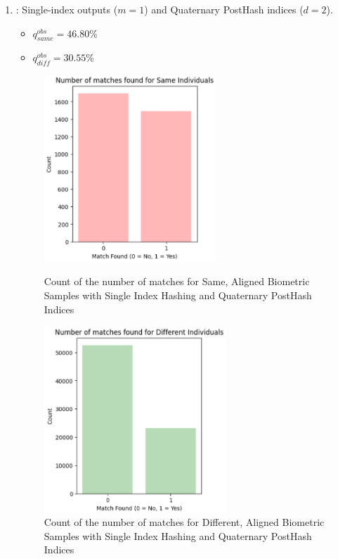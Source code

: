 \begin{enumerate}
    \item {}: Single-index outputs (\(m=1\)) and Quaternary PostHash indices (\(d=2\)).
    \begin{itemize}
        \item \(q_{same}^{obs} = 46.80\%\)
        \item \(q_{diff}^{obs} = 30.55\%\)
    \end{itemize}

    \begin{figure}[H]
        \centering
        \begin{minipage}[b]{0.48\linewidth}
            \centering
            \includegraphics[width=\linewidth,height=7cm,keepaspectratio]{latex-img/d2same.png}
            \caption{Count of the number of matches for Same, Aligned Biometric Samples with Single Index Hashing and Quaternary PostHash Indices}
            \label{mu_same}
        \end{minipage}
        \hfill
        \begin{minipage}[b]{0.48\linewidth}
            \centering
            \includegraphics[width=\linewidth,height=7cm,keepaspectratio]{latex-img/d2diff.png}
            \caption{Count of the number of matches for Different, Aligned Biometric Samples with Single Index Hashing and Quaternary PostHash Indices}
            \label{mu_diff}
        \end{minipage}
    \end{figure}
    

\end{enumerate}
